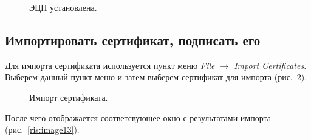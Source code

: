 \documentclass[10pt,a4paper,titlepage]{article}
\begin{document}
\begin{figure}[!h]	
\caption{ЭЦП установлена.}
\label{ris:image11}
\end{figure}

\pagebreak
\subsection{Импортировать сертификат, подписать его}
Для импорта сертификата используется пункт меню \textit{File $\rightarrow$ Import Certificates}. Выберем данный пункт меню и затем выберем сертификат для импорта \mbox{(рис. \ref{ris:image12})}.

\begin{figure}[!h]	
\caption{Импорт сертификата.}
\label{ris:image12}
\end{figure}

После чего отображается соответсвующее окно с результатами импорта \mbox{(рис. \ref{ris:image13})}.
\end{document}
